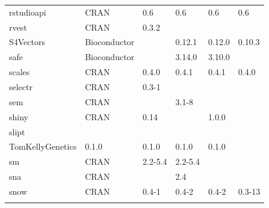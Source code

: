 \begin{longtable}{llllll}
\rowcolor{black!10}
rstudioapi                    & \acrshort{CRAN}                      & 0.6         & 0.6         & 0.6            & 0.6               \\
\rowcolor{black!5}
rvest                         & \acrshort{CRAN}                      & 0.3.2       &             &                &                    \\
\rowcolor{black!10}
S4Vectors                     & Bioconductor              &             & 0.12.1      & 0.12.0         & 0.10.3            \\
\rowcolor{black!5}
safe                          & Bioconductor              &             & 3.14.0      & 3.10.0         &                    \\
\rowcolor{black!10}
scales                        & \acrshort{CRAN}                      & 0.4.0       & 0.4.1       & 0.4.1          & 0.4.0             \\
\rowcolor{black!5}
selectr                       & \acrshort{CRAN}                      & 0.3-1       &             &                &                    \\
\rowcolor{black!10}
sem                           & \acrshort{CRAN}                      &             & 3.1-8       &                &                   \\
\rowcolor{black!5}
shiny                         & \acrshort{CRAN}                      & 0.14        &             & 1.0.0          &                    \\
\rowcolor{black!10}
slipt                         & \begin{tabular}[c]{@{}l@{}}GitHub \\ TomKellyGenetics \end{tabular}  & 0.1.0       & 0.1.0       & 0.1.0          & 0.1.0             \\
\rowcolor{black!5}
sm                            & \acrshort{CRAN}                      & 2.2-5.4     & 2.2-5.4     &                &                    \\
\rowcolor{black!10}
sna                           & \acrshort{CRAN}                      &             & 2.4         &                &                   \\
\rowcolor{black!5}
snow                          & \acrshort{CRAN}                      & 0.4-1       & 0.4-2       & 0.4-2          & 0.3-13             \\
\rowcolor{black!10}

\end{longtable}
